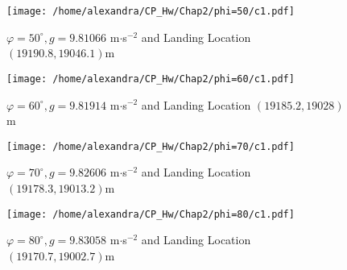 \documentclass[a4paper]{article}
\begin{document}
\begin{figure}[htbp]
\centering
\texttt{[image: /home/alexandra/CP\_Hw/Chap2/phi=50/c1.pdf]}
\caption{$\varphi=50^\circ,g=9.81066$ m$\cdot$s$^{-2}$ and Landing Location $(19190.8,19046.1)$m}
\end{figure}

\begin{figure}[htbp]
\centering
\texttt{[image: /home/alexandra/CP\_Hw/Chap2/phi=60/c1.pdf]}
\caption{$\varphi=60^\circ,g=9.81914$ m$\cdot$s$^{-2}$ and Landing Location $(19185.2,19028)$m}
\end{figure}

\begin{figure}[htbp]
\centering
\texttt{[image: /home/alexandra/CP\_Hw/Chap2/phi=70/c1.pdf]}
\caption{$\varphi=70^\circ,g=9.82606$ m$\cdot$s$^{-2}$ and Landing Location $(19178.3,19013.2)$m}
\end{figure}

\begin{figure}[htbp]
\centering
\texttt{[image: /home/alexandra/CP\_Hw/Chap2/phi=80/c1.pdf]}
\caption{$\varphi=80^\circ,g=9.83058$ m$\cdot$s$^{-2}$ and Landing Location $(19170.7,19002.7)$m}
\end{figure}
\end{document}
